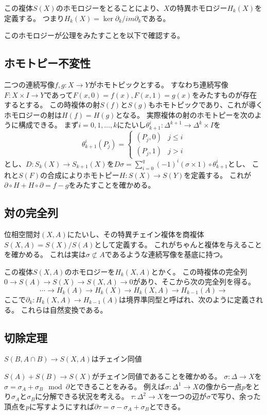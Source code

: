 \documentclass{jsarticle}
\begin{document}
この複体$S(X)$のホモロジーをとることにより、$X$の特異ホモロジー$H_k(X)$を定義する。
つまり$H_k(X)=\ker\partial_k/im\partial_k$である。

このホモロジーが公理をみたすことを以下で確認する。
\subsection{ホモトピー不変性}
二つの連続写像$f, g\colon X\to Y$がホモトピックとする。
すなわち連続写像$F\colon X\times I\to Y$であって$F(x,0)=f(x), F(x,1)=g(x)$をみたすものが存在するとする。
この時複体の射$S(f)$と$S(g)$もホモトピックであり、これが導くホモロジーの射は$H(f)=H(g)$となる。
実際複体の射のホモトピーを次のように構成できる。
まず$i=0,1,\ldots,k$にたいし$\theta^i_{k+1}\colon\Delta^{k+1}\to\Delta^k\times I$を
\[
\theta^i_{k+1}(P_j)=\begin{cases}(P_j,0)&j\leq i\\(P_j,1)&j>i\end{cases}
\]
とし、$D\colon S_k(X)\to S_{k+1}(X)$を$D\sigma=\sum^q_{i=0}(-1)^i(\sigma\times1)\circ\theta^i_{k+1}$とし、
これと$S(F)$の合成によりホモトピー$H\colon S(X)\to S(Y)$を定義する。
これが$\partial\circ H+H\circ\partial=f-g$をみたすことを確かめる。


\subsection{対の完全列}
位相空間対$(X,A)$にたいし、その特異チェイン複体を商複体$S(X,A)=S(X)/S(A)$として定義する。
これがちゃんと複体を与えることを確かめる。
これは実は$\sigma\not\subset A$であるような連続写像を基底に持つ。

この複体$S(X,A)$のホモロジーを$H_k(X,A)$とかく。
この時複体の完全列$0\to S(A)\to S(X)\to S(X,A)\to 0$があり、そこから次の完全列を得る。
\[
\cdots\to H_k(A)\to H_k(X)\to H_k(X, A)\to H_{k-1}(A)\to
\]
ここで$\partial_k\colon H_k(X,A)\to H_{k-1}(A)$は境界準同型と呼ばれ、次のように定義される。
これらは自然変換である。
\subsection{切除定理}
$S(B,A\cap B)\to S(X,A)$はチェイン同値

$S(A)+S(B)\to S(X)$がチェイン同値であることを確かめる。
$\sigma\colon\Delta\to X$を$\sigma=\sigma_A+\sigma_B\mod \partial$とできることをみる。
例えば$\sigma\colon\Delta^1\to X$の像から一点$p$をとり$\sigma_A$と$\sigma_B$に分解できる状況を考える。
$\tau\colon\Delta^2\to X$を一つの辺が$\sigma$で写り、余った頂点を$p$に写すようにすれば$\partial\tau=\sigma-\sigma_A+\sigma_B$とできる。
\end{document}
